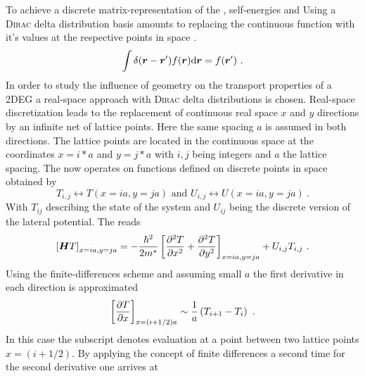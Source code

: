 To achieve a discrete matrix-representation of the \hamil{}, self-energies and
Using a \textsc{Dirac} delta distribution basis amounts to replacing the continuous function with it's values at the respective points in space \cite{JApplPhys.92.3730}.
\begin{equation}
  \int \delta (\boldsymbol{r}-\boldsymbol{r}') f(\boldsymbol{r}) \mathrm{d}\boldsymbol{r} = f(\boldsymbol{r}')\ .
  \label{eqn:deltabasis}
\end{equation}
In order to study the influence of geometry on the transport properties of a 2DEG a real-space approach with \textsc{Dirac} delta distributions is chosen. Real-space discretization leads to the replacement of continuous real space $x$ and $y$ directions by an infinite net of lattice points. Here the same spacing $a$ is assumed in both directions. The lattice points are located in the continuous space at the coordinates $x=i*a$ and $y=j*a$ with $i,j$ being integers and $a$ the lattice spacing. The \hamil{} now operates on functions defined on discrete points in space obtained by
\begin{equation}
  T_{i,j} \leftrightarrow T(x=ia,y=ja) \mbox{ and } U_{i,j}\leftrightarrow U(x=ia,y=ja)\ .
  \label{FunctionDescrete}
\end{equation}
With $T_{ij}$ describing the state of the system and $U_{ij}$ being the discrete version of the lateral potential.
The \hamil{} reads
\begin{equation}
  \left[\v{H}T\right]_{x=ia,y=ja}=-\frac{\hbar^{2}}{2m^*}\left[\pdd{T}{x}+\pdd{T}{y}\right]_{x=ia,y=ja}+U_{i,j}T_{i,j}\ .
  \label{DiscreteHamil}
\end{equation}
Using the finite-differences scheme and assuming small $a$ the first derivative in each direction is approximated 
\begin{equation}
  \left[\frac{\partial T}{\partial x}\right]_{x=(i+1/2)a} \sim  \frac{1}{a}\left(T_{i+1}-T_{i}\right)\ .
  \label{ApproximateFirstDerivative}
\end{equation}
In this case the subscript denotes evaluation at a point between two lattice points $x=(i+1/2)$. By applying the concept of finite differences a second time for the second derivative one arrives at
